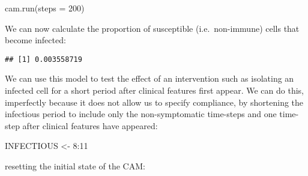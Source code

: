 \documentclass[
  12pt,
  a4paper]{book}
\newenvironment{Shaded}{\begin{snugshade}}{\end{snugshade}}
\newcommand{\AttributeTok}[1]{\textcolor[rgb]{0.77,0.63,0.00}{#1}}
\newcommand{\DecValTok}[1]{\textcolor[rgb]{0.00,0.00,0.81}{#1}}
\newcommand{\FunctionTok}[1]{\textcolor[rgb]{0.00,0.00,0.00}{#1}}
\newcommand{\NormalTok}[1]{#1}
\newcommand{\OtherTok}[1]{\textcolor[rgb]{0.56,0.35,0.01}{#1}}
\newcommand{\SpecialCharTok}[1]{\textcolor[rgb]{0.00,0.00,0.00}{#1}}
\begin{document}
\begin{Shaded}
\begin{Highlighting}[]
\FunctionTok{cam.run}\NormalTok{(}\AttributeTok{steps =} \DecValTok{200}\NormalTok{)}
\end{Highlighting}
\end{Shaded}

We can now calculate the proportion of susceptible (i.e.~non-immune) cells that become infected:

\begin{Shaded}
\end{Shaded}

\begin{verbatim}
## [1] 0.003558719
\end{verbatim}

We can use this model to test the effect of an intervention such as isolating an infected cell for a short period after clinical features first appear. We can do this, imperfectly because it does not allow us to specify compliance, by shortening the infectious period to include only the non-symptomatic time-steps and one time- step after clinical features have appeared:

\begin{Shaded}
\begin{Highlighting}[]
\NormalTok{INFECTIOUS }\OtherTok{\textless{}{-}} \DecValTok{8}\SpecialCharTok{:}\DecValTok{11}
\end{Highlighting}
\end{Shaded}

resetting the initial state of the CAM:
\end{document}
